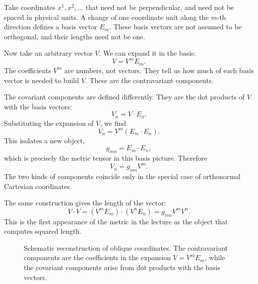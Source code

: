 Take coordinates \(x^1,x^2,\dots\) that need not be perpendicular, and need not be spaced in physical units. A change of one coordinate unit along the \(m\)-th direction defines a basis vector \(E_m\). These basis vectors are not assumed to be orthogonal, and their lengths need not be one.

Now take an arbitrary vector \(V\). We can expand it in the basis:
\begin{equation}
V = V^m E_m.
\end{equation}
The coefficients \(V^m\) are numbers, not vectors. They tell us how much of each basis vector is needed to build \(V\). These are the contravariant components.

The covariant components are defined differently. They are the dot products of \(V\) with the basis vectors:
\begin{equation}
V_n = V \cdot E_n.
\end{equation}
Substituting the expansion of \(V\), we find
\begin{equation}
V_n = V^m (E_m \cdot E_n).
\end{equation}
This isolates a new object,
\begin{equation}
g_{mn} = E_m \cdot E_n,
\end{equation}
which is precisely the metric tensor in this basis picture. Therefore
\begin{equation}
V_n = g_{mn} V^m.
\end{equation}
The two kinds of components coincide only in the special case of orthonormal Cartesian coordinates.

The same construction gives the length of the vector:
\begin{equation}
V \cdot V = (V^m E_m)\cdot (V^n E_n) = g_{mn}V^mV^n.
\end{equation}
This is the first appearance of the metric in the lecture as the object that computes squared length.

\begin{figure}[t]
\centering
{}
\caption{Schematic reconstruction of oblique coordinates. The contravariant components are the coefficients in the expansion \(V=V^mE_m\), while the covariant components arise from dot products with the basis vectors.}
\end{figure}

